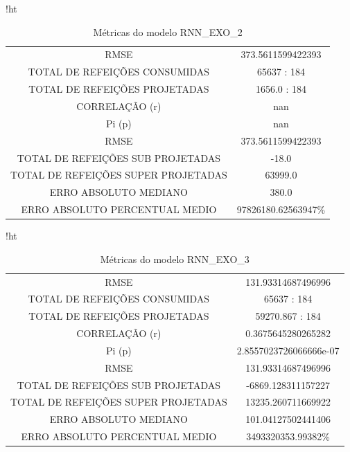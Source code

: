 \documentclass[	12pt, Times, openright, twoside, a4paper, english, brazil]{abntex2}
\begin{document}
            \begin{table}{!ht}
                \centering
                \caption{Métricas do modelo  RNN\_EXO\_2 }
                    \begin{tabular}{|c|c|}
                    \rowcolor{gray!50}
                    \hline
            \multicolumn{2}{c}{RNN\_EXO\_2} \\ \hline
            RMSE&  373.5611599422393\\
            TOTAL DE REFEIÇÕES CONSUMIDAS & 65637 : 184\\
            TOTAL DE REFEIÇÕES PROJETADAS & 1656.0 : 184 \\
            CORRELAÇÃO (r) & nan \\ Pi (p) & nan\\
            RMSE & 373.5611599422393\\
            TOTAL DE REFEIÇÕES SUB PROJETADAS & -18.0\\
            TOTAL DE REFEIÇÕES SUPER PROJETADAS & 63999.0\\
            ERRO ABSOLUTO MEDIANO & 380.0\\
            ERRO ABSOLUTO PERCENTUAL MEDIO & 97826180.62563947\% \\ \hline \end{tabular} \end{table}
            
             \begin{table}{!ht}
                \centering
                \caption{Métricas do modelo  RNN\_EXO\_3 }
                    \begin{tabular}{|c|c|}
                    \rowcolor{gray!50}
                    \hline
            \multicolumn{2}{c}{RNN\_EXO\_3} \\ \hline
            RMSE &  131.93314687496996\\
            TOTAL DE REFEIÇÕES CONSUMIDAS & 65637 : 184 \\
            TOTAL DE REFEIÇÕES PROJETADAS & 59270.867 : 184 \\
            CORRELAÇÃO (r) & 0.3675645280265282 \\
            Pi (p) & 2.8557023726066666e-07\\
            RMSE & 131.93314687496996\\
            TOTAL DE REFEIÇÕES SUB PROJETADAS & -6869.128311157227\\
            TOTAL DE REFEIÇÕES SUPER PROJETADAS & 13235.260711669922\\
            ERRO ABSOLUTO MEDIANO & 101.04127502441406\\
            ERRO ABSOLUTO PERCENTUAL MEDIO & 3493320353.99382\% \\ \hline \end{tabular}
    	    \end{table}
    	    
\end{document}

